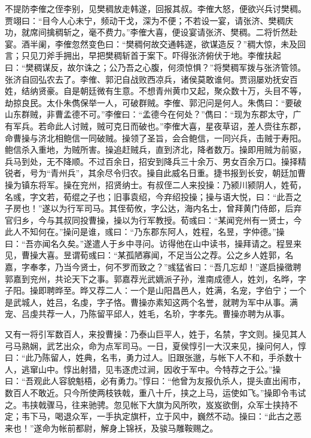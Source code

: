 不提防李傕之侄李别，见樊稠放走韩遂，回报其叔。李傕大怒，便欲兴兵讨樊稠。贾翊曰：“目今人心未宁，频动干戈，深为不便；不若设一宴，请张济、樊稠庆功，就席间擒稠斩之，毫不费力。”李傕大喜，便设宴请张济、樊稠。二将忻然赴宴。酒半阑，李傕忽然变色曰：“樊稠何故交通韩遂，欲谋造反？”稠大惊，未及回言；只见刀斧手拥出，早把樊稠斩首于案下。吓得张济俯伏于地。李傕扶起曰：“樊稠谋反，故尔诛之；公乃吾之心腹，何须惊惧？”将樊稠军拨与张济管领。张济自回弘农去了。李傕、郭汜自战败西凉兵，诸侯莫敢谁何。贾诩屡劝抚安百姓，结纳贤豪。自是朝廷微有生意。不想青州黄巾又起，聚众数十万，头目不等，劫掠良民。太仆朱儁保举一人，可破群贼。李傕、郭汜问是何人。朱儁曰：“要破山东群贼，非曹孟德不可。”李傕曰：“孟德今在何处？”儁曰：“现为东郡太守，广有军兵。若命此人讨贼，贼可克日而破也。”李傕大喜，星夜草诏，差人赍往东郡，命曹操与济北相鲍信一同破贼。操领了圣旨，会合鲍信，一同兴兵，击贼于寿阳。鲍信杀入重地，为贼所害。操追赶贼兵，直到济北，降者数万。操即用贼为前驱，兵马到处，无不降顺。不过百余日，招安到降兵三十余万、男女百余万口。操择精锐者，号为“青州兵”，其余尽令归农。操自此威名日重。捷书报到长安，朝廷加曹操为镇东将军。操在兖州，招贤纳士。有叔侄二人来投操：乃颍川颍阴人，姓荀，名彧，字文若，荀绲之子也；旧事袁绍，今弃绍投操；操与语大悦，曰：“此吾之子房也！”遂以为行军司马。其侄荀攸，字公达，海内名士，曾拜黄门侍郎，后弃官归乡，今与其叔同投曹操，操以为行军教授。荀彧曰：“某闻兖州有一贤士，今此人不知何在。”操问是谁，彧曰：“乃东郡东阿人，姓程，名昱，字仲德。”操曰：“吾亦闻名久矣。”遂遣人于乡中寻问。访得他在山中读书，操拜请之。程昱来见，曹操大喜。昱谓荀彧曰：“某孤陋寡闻，不足当公之荐。公之乡人姓郭，名嘉，字奉孝，乃当今贤士，何不罗而致之？”彧猛省曰：“吾几忘却！”遂启操徵聘郭嘉到兖州，共论天下之事。郭嘉荐光武嫡派子孙，淮南成德人，姓刘，名晔，字子阳。操即聘晔至。晔又荐二人：一个是山阳昌邑人，姓满，名宠，字伯宁；一个是武城人，姓吕，名虔，字子恪。曹操亦素知这两个名誉，就聘为军中从事。满宠、吕虔共荐一人，乃陈留平邱人，姓毛，名玠，字孝先。曹操亦聘为从事。

又有一将引军数百人，来投曹操：乃泰山巨平人，姓于，名禁，字文则。操见其人弓马熟娴，武艺出众，命为点军司马。一日，夏侯惇引一大汉来见，操问何人，惇曰：“此乃陈留人，姓典，名韦，勇力过人。旧跟张邈，与帐下人不和，手杀数十人，逃窜山中。惇出射猎，见韦逐虎过涧，因收于军中。今特荐之于公。”操曰：“吾观此人容貌魁梧，必有勇力。”惇曰：“他曾为友报仇杀人，提头直出闹市，数百人不敢近。只今所使两枝铁戟，重八十斤，挟之上马，运使如飞。”操即令韦试之。韦挟戟骤马，往来驰骋。忽见帐下大旗为风所吹，岌岌欲倒，众军士挟持不定；韦下马，喝退众军，一手执定旗杆，立于风中，巍然不动。操曰：“此古之恶来也！”遂命为帐前都尉，解身上锦袄，及骏马雕鞍赐之。


